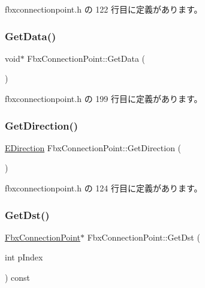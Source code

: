  fbxconnectionpoint.\+h の 122 行目に定義があります。

\mbox{\label{class_fbx_connection_point_a52b3cc91f090580f9ae53d1da380b50a}} 
\subsubsection{\texorpdfstring{Get\+Data()}{GetData()}}
{\footnotesize\ttfamily void$\ast$ Fbx\+Connection\+Point\+::\+Get\+Data (\begin{DoxyParamCaption}{ }\end{DoxyParamCaption})\hspace{0.3cm}{\ttfamily [inline]}}



 fbxconnectionpoint.\+h の 199 行目に定義があります。

\mbox{\label{class_fbx_connection_point_a542ebd55ef536a8dbad04ff8c097e007}} 
\subsubsection{\texorpdfstring{Get\+Direction()}{GetDirection()}}
{\footnotesize\ttfamily \hyperlink{class_fbx_connection_point_a39937aa7b1e2137db6384c1e5756dfff}{E\+Direction} Fbx\+Connection\+Point\+::\+Get\+Direction (\begin{DoxyParamCaption}{ }\end{DoxyParamCaption})\hspace{0.3cm}{\ttfamily [inline]}}



 fbxconnectionpoint.\+h の 124 行目に定義があります。

\mbox{\label{class_fbx_connection_point_ad31242315b645c26f4871d3fb33b098f}} 
\subsubsection{\texorpdfstring{Get\+Dst()}{GetDst()}\hspace{0.1cm}{\footnotesize\ttfamily [1/2]}}
{\footnotesize\ttfamily \hyperlink{class_fbx_connection_point}{Fbx\+Connection\+Point}$\ast$ Fbx\+Connection\+Point\+::\+Get\+Dst (\begin{DoxyParamCaption}\item[{int}]{p\+Index }\end{DoxyParamCaption}) const\hspace{0.3cm}{\ttfamily [inline]}}



